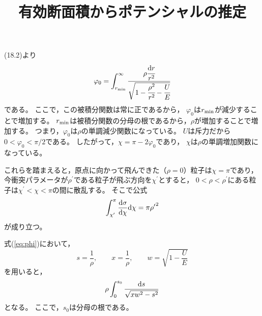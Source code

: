 \documentclass[a4paper,12pt]{jsarticle}
\title{有効断面積からポテンシャルの推定}
\newcommand{\dif}[2]{\frac{{\rm d} #1}{{\rm d} #2}}
\begin{document}
\maketitle

(18.2)より
\begin{equation}
	{\varphi}_0 = \int_{r_{\rm min}}^{\infty} \cfrac{\rho \cfrac{{\rm d}r}{r^2}}
	{\sqrt{1 - \cfrac{\rho^2}{r^2} - \cfrac{U}{E}}}
	\label{eq:phi}
\end{equation}
である。
ここで，この被積分関数は常に正であるから，
$\varphi_0$は$r_{\rm min}$が減少することで増加する。
$r_{\rm min}$は被積分関数の分母の根であるから，$\rho$が増加することで増加する。
つまり，$\varphi_0$は$\rho$の単調減少関数になっている。
$U$は斥力だから$0 < \varphi_0 < \pi/2$である。
したがって，$\chi = \pi - 2\varphi_0$であり，
$\chi$は$\rho$の単調増加関数になっている。

これらを踏まえると，原点に向かって飛んできた（$\rho = 0$）粒子は$\chi = \pi$であり，
今衝突パラメータが$\rho^{\prime}$である粒子が飛ぶ方向を$\chi^{\prime}$とすると，
$0 < \rho < \rho^{\prime}$にある粒子は$\chi^{\prime} < \chi < \pi$の間に散乱する。
そこで公式
\begin{equation}
	\int_{\chi^{\prime}}^{\pi} \dif{\sigma}{\chi} {\rm d}\chi
	= \pi {\rho^{\prime}}^2
\end{equation}
が成り立つ。

式(\eqref{eq:phi})において，
\begin{equation}
	s = \frac{1}{\rho}, \qquad x = \frac{1}{\rho},
	\qquad w = \sqrt{1 - \frac{U}{E}}
\end{equation}
を用いると，
\begin{equation}
	\rho \int_0^{s_0} \frac{{\rm d}s}
	{\sqrt{xw^2 - s^2}}
\end{equation}
となる。
ここで，$s_0$は分母の根である。
\end{document}
